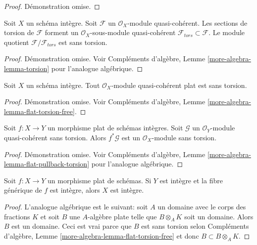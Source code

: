\begin{proof}
Démonstration omise.
\end{proof}

\begin{lemma}
\label{lemma-torsion}
Soit  $X$  un schéma intègre. Soit  $\mathcal{F}$  un  $\mathcal{O}_X$-module
quasi-cohérent. Les sections de torsion de  $\mathcal{F}$  forment un
 $\mathcal{O}_X$-sous-module quasi-cohérent  $\mathcal{F}_{tors} \subset \mathcal{F}$. Le module quotient
 $\mathcal{F}/\mathcal{F}_{tors}$  est sans torsion.
\end{lemma}

\begin{proof}
Démonstration omise. Voir Compléments d'algèbre, Lemme  \ref{more-algebra-lemma-torsion}  pour l'analogue algébrique.
\end{proof}

\begin{lemma}
\label{lemma-flat-torsion-free}
Soit  $X$  un schéma intègre. Tout  $\mathcal{O}_X$-module quasi-cohérent plat
est sans torsion.
\end{lemma}

\begin{proof}
Démonstration omise. Voir Compléments d'algèbre, Lemme  \ref{more-algebra-lemma-flat-torsion-free}.
\end{proof}

\begin{lemma}
\label{lemma-flat-pullback-torsion}
Soit  $f : X \to Y$  un morphisme plat de schémas intègres. Soit  $\mathcal{G}$  un
 $\mathcal{O}_Y$-module quasi-cohérent sans torsion. Alors  $f^*\mathcal{G}$  est un
 $\mathcal{O}_X$-module sans torsion.
\end{lemma}

\begin{proof}
Démonstration omise. Voir Compléments d'algèbre, Lemme  \ref{more-algebra-lemma-flat-pullback-torsion}  pour l'analogue algébrique.
\end{proof}

\begin{lemma}
\label{lemma-flat-over-integral-integral-fibre}
Soit  $f : X \to Y$  un morphisme plat de schémas. Si  $Y$  est intègre et la
fibre générique de  $f$  est intègre, alors  $X$  est intègre.
\end{lemma}

\begin{proof}
L'analogue algébrique est le suivant: soit  $A$  un domaine avec le corps
des fractions  $K$  et soit  $B$  une  $A$-algèbre plate
telle que  $B \otimes_A K$  soit un domaine. Alors  $B$  est un domaine. Ceci
est vrai parce que  $B$  est sans torsion selon Compléments d'algèbre, Lemme
 \ref{more-algebra-lemma-flat-torsion-free}  et donc  $B \subset B \otimes_A K$.
\end{proof}

